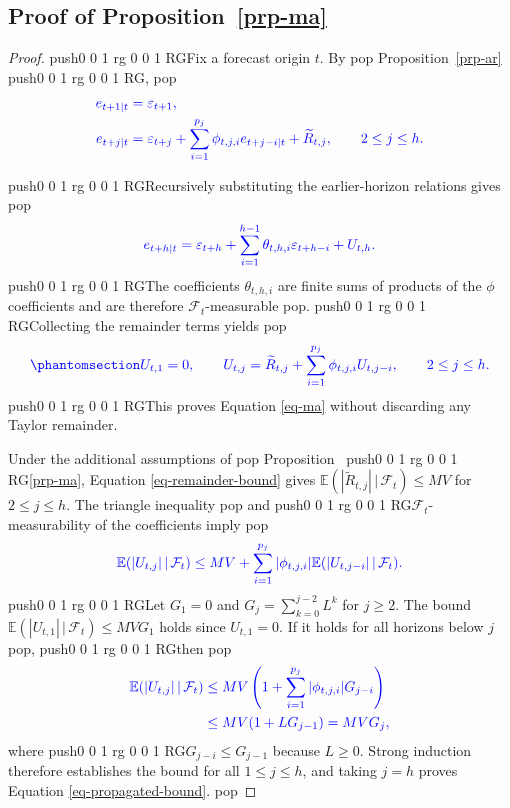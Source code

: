 \documentclass[
  american,
  12pt]{article}
\theoremstyle{plain}
\theoremstyle{plain}
\theoremstyle{remark}
\newcommand{\CPTSadd}[1]{\ifmmode\else\leavevmode\fi\pdfcolorstack 0 push{0 0 1 rg 0 0 1 RG}#1\pdfcolorstack 0 pop}
\begin{document}
\subsection{\texorpdfstring{Proof of
Proposition~\ref{prp-ma}}{Proof of Proposition~}}\label{sec-proof_ma}

\begin{proof}
\CPTSadd{Fix a forecast origin \(t\). By} Proposition~\ref{prp-ar}\CPTSadd{,} \begin{align*}
\CPTSadd{e_{t+1|t}}&\CPTSadd{=\varepsilon_{t+1},}\\
\CPTSadd{e_{t+j|t}}&\CPTSadd{=\varepsilon_{t+j}+\sum_{i=1}^{p_j}\phi_{t,j,i}e_{t+j-i|t}+\widetilde R_{t,j},\qquad 2\leq j\leq h.}
\end{align*}

\CPTSadd{Recursively substituting the earlier-horizon relations gives} \[
\CPTSadd{e_{t+h|t}=\varepsilon_{t+h}+\sum_{i=1}^{h-1}\theta_{t,h,i}\varepsilon_{t+h-i}+U_{t,h}.}
\] \CPTSadd{The coefficients \(\theta_{t,h,i}\) are finite sums of products of
the \(\phi\) coefficients and are therefore \(\mathcal F_t\)-measurable}.
\CPTSadd{Collecting the remainder terms yields}
\begin{equation}\CPTSadd{\phantomsection\label{eq-propagated-remainder}{
U_{t,1}=0,\qquad
U_{t,j}=\widetilde R_{t,j}+\sum_{i=1}^{p_j}\phi_{t,j,i}U_{t,j-i},\qquad 2\leq j\leq h.
}}\end{equation} \CPTSadd{This proves Equation \eqref{eq-ma} without discarding
any Taylor remainder.

Under the additional assumptions of} Proposition~\CPTSadd{\ref{prp-ma}, Equation
\eqref{eq-remainder-bound} gives
\(\mathbb E(|\widetilde R_{t,j}|\,|\,\mathcal F_t)\leq MV\) for
\(2\leq j\leq h\). The triangle inequality} and
\CPTSadd{\(\mathcal F_t\)-measurability of the coefficients imply} \[
\CPTSadd{\mathbb E(|U_{t,j}|\,|\,\mathcal F_t)
\leq MV+\sum_{i=1}^{p_j}|\phi_{t,j,i}|
\mathbb E(|U_{t,j-i}|\,|\,\mathcal F_t).}
\] \CPTSadd{Let \(G_1=0\) and \(G_j=\sum_{k=0}^{j-2}L^k\) for \(j\geq2\). The
bound \(\mathbb E(|U_{t,1}|\,|\,\mathcal F_t)\leq MVG_1\) holds since
\(U_{t,1}=0\). If it holds for all horizons below \(j\)}, \CPTSadd{then}
\begin{align*}
\CPTSadd{\mathbb E(|U_{t,j}|\,|\,\mathcal F_t)}
&\CPTSadd{\leq MV\left(1+\sum_{i=1}^{p_j}|\phi_{t,j,i}|G_{j-i}\right)}\\
&\CPTSadd{\leq MV(1+LG_{j-1})=MVG_j,}
\end{align*} where \CPTSadd{\(G_{j-i}\leq G_{j-1}\) because \(L\geq0\). Strong
induction therefore establishes the bound for all \(1\leq j\leq h\), and
taking \(j=h\) proves Equation \eqref{eq-propagated-bound}.}
\end{proof}
\end{document}
